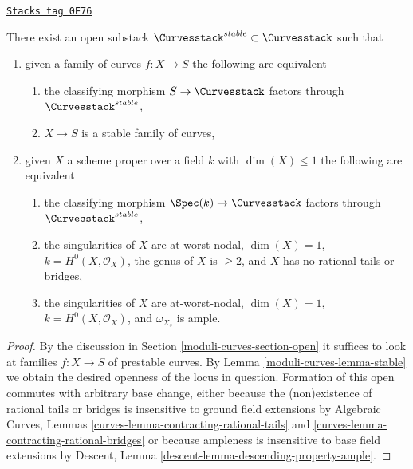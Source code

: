\begin{lemma}
\label{moduli-curves-lemma-stable-curves}
\href{https://stacks.math.columbia.edu/tag/0E76}{\texttt{Stacks tag 0E76}}

There exist an open substack $\Curvesstack^{stable} \subset \Curvesstack$
such that
\begin{enumerate}
\item given a family of curves $f : X \to S$ the following are equivalent
\begin{enumerate}
\item the classifying morphism $S \to \Curvesstack$ factors
through $\Curvesstack^{stable}$,
\item $X \to S$ is a stable family of curves,
\end{enumerate}
\item given $X$ a scheme proper over a field $k$ with
$\dim(X) \leq 1$ the following are equivalent
\begin{enumerate}
\item the classifying morphism $\Spec(k) \to \Curvesstack$
factors through $\Curvesstack^{stable}$,
\item the singularities of $X$ are at-worst-nodal, $\dim(X) = 1$,
$k = H^0(X, \mathcal{O}_X)$, the genus of $X$ is $\geq 2$, and
$X$ has no rational tails or bridges,
\item the singularities of $X$ are at-worst-nodal, $\dim(X) = 1$,
$k = H^0(X, \mathcal{O}_X)$, and $\omega_{X_s}$ is ample.
\end{enumerate}
\end{enumerate}
\end{lemma}

\begin{proof}
By the discussion in Section \ref{moduli-curves-section-open}
it suffices to look at families $f : X \to S$ of
prestable curves. By Lemma \ref{moduli-curves-lemma-stable}
we obtain the desired openness of the locus in question.
Formation of this open commutes with arbitrary base change,
either because the (non)existence of rational tails or bridges
is insensitive to ground field extensions by
Algebraic Curves, Lemmas
\ref{curves-lemma-contracting-rational-tails} and
\ref{curves-lemma-contracting-rational-bridges}
or because ampleness is insensitive to base field extensions by
Descent, Lemma \ref{descent-lemma-descending-property-ample}.
\end{proof}

